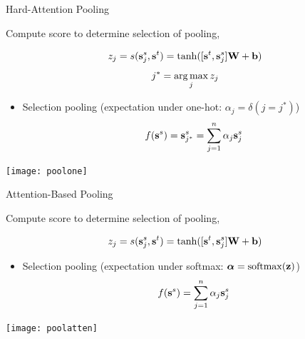 \documentclass{beamer}
\begin{document}
\begin{frame}{Hard-Attention Pooling}

  Compute score to determine selection of pooling,

  \[ z_j = s(\mathbf{s}^s_j, \mathbf{s}^t) = \tanh ([ \mathbf{s}^t,  \mathbf{s}^s_j ] \mathbf{W} + \mathbf{b})   \] 
  \[ j^* = \argmax_{j} z_j \]

  \begin{itemize}
  \item Selection pooling (expectation under one-hot:  $\alpha_j = \delta(j = j^*)$)
    \[ f(\mathbf{s}^s) =  \mathbf{s}_{j^*}^s = \sum_{j=1}^n \alpha_j \mathbf{s}_j^s \] 
  \end{itemize}
  \begin{center}
    \texttt{[image: poolone]}
  \end{center}

\end{frame}


\begin{frame}{Attention-Based Pooling}

  Compute score to determine selection of pooling,

  \[ z_j = s(\mathbf{s}^s_j, \mathbf{s}^t) = \tanh ([ \mathbf{s}^t,  \mathbf{s}^s_j ] \mathbf{W} + \mathbf{b})   \] 

  \begin{itemize}
  \item Selection pooling (expectation under softmax: $\balpha = \softmax(\boldz)$)
    \[ f(\mathbf{s}^s) =  \sum_{j=1}^n \alpha_j \mathbf{s}_j^s \] 
  \end{itemize}
  \begin{center}
    \texttt{[image: poolatten]}
  \end{center}

\end{frame}
\end{document}
